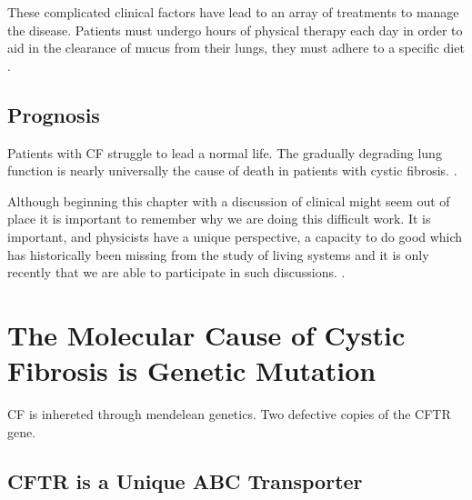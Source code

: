 These complicated clinical factors have lead to an array of treatments to manage the disease. Patients must undergo hours of physical therapy each day in order to aid in the clearance of mucus from their lungs, they must adhere to a specific diet . 

\subsection{Prognosis}
Patients with CF struggle to lead a normal life. 
The gradually degrading lung function is nearly universally the cause of death in patients with cystic fibrosis. .

Although beginning this chapter with a discussion of clinical might seem out of place it is important to remember why we are doing this difficult work. It is important, and physicists have a unique perspective, a capacity to do good which has historically been missing from the study of living systems and it is only recently that we are able to participate in such discussions. .

\section{The Molecular Cause of Cystic Fibrosis is Genetic Mutation}
CF is inhereted through mendelean genetics. Two defective copies of the CFTR gene. 

\subsection{CFTR is a Unique ABC Transporter}

